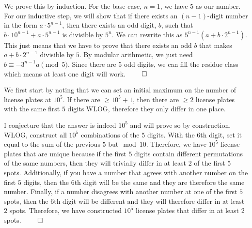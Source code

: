 \documentclass{report}
\begin{document}
\sol We prove this by induction. For the base case, $n=1$, we have $5$ as our number. For our inductive step, we will show that if there exists an $(n-1)$-digit number in the form $a \cdot 5^{n-1}$, then there exists an odd digit, $b$, such that $b \cdot 10^{n-1} + a \cdot 5^{n-1}$ is divisible by $5^n$. We can rewrite this as $5^{n-1}(a + b\cdot 2^{n-1})$. This just means that we have to prove that there exists an odd $b$ that makes $a + b\cdot 2^{n-1}$ divisible by $5$. By modular arithmetic, we just need $b \equiv -3^{n-1}a \pmod{5}$. Since there are $5$ odd digits, we can fill the residue class which means at least one digit will work. $\qed$

\sol We first start by noting that we can set an initial maximum on the number of license plates at $10^5$. If there are $\geq 10^5 + 1$, then there are $\geq 2$ license plates with the same first $5$ digits WLOG, therefore they only differ in one place.

I conjecture that the answer is indeed $10^5$ and will prove so by construction. WLOG, construct all $10^5$ combinations of the $5$ digits. With the $6$th digit, set it equal to the sum of the previous $5$ but$\mod{10}$. Therefore, we have $10^5$ license plates that are unique because if the first $5$ digits contain different permutations of the same numbers, then they will trivially differ in at least 2 of the first 5 spots. Additionally, if you have a number that agrees with another number on the first $5$ digits, then the $6$th digit will be the same and they are therefore the same number. Finally, if a number disagrees with another number at one of the first $5$ spots, then the $6$th digit will be different and they will therefore differ in at least $2$ spots. Therefore, we have constructed $10^5$ license plates that differ in at least $2$ spots. $\qed$
\end{document}
